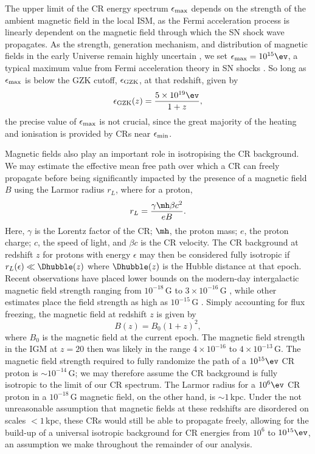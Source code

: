 The upper limit of the CR energy spectrum $\epsilon_{\rm max}$ depends on the strength of the ambient magnetic field in the local ISM, as the Fermi acceleration process is linearly dependent on the magnetic field through which the SN shock wave propagates. As the strength, generation mechanism, and distribution of magnetic fields in the early Universe remain highly uncertain \citep{DurrerNeronov2013}, we set $\epsilon_{\rm max} = 10^{15}\ev$, a typical maximum value from Fermi acceleration theory in SN shocks \citep[e.g.,][]{BlandfordEichler1987}.  So long as $\epsilon_{\rm max}$ is below the GZK cutoff, $\epsilon_{\rm \small GZK}$, at that redshift, given by \citep{StacyBromm2007}
\begin{equation}
\epsilon_{\rm \small GZK}(z) = \frac{5\times10^{19}\ev}{1+z},
\end{equation}
the precise value of $\epsilon_{\rm max}$ is not crucial, since the great majority of the heating and ionisation is provided by CRs near $\epsilon_{\rm min}$.

Magnetic fields also play an important role in isotropising the CR background.  We may estimate the effective mean free path over which a CR can freely propagate before being significantly impacted by the presence of a magnetic field $B$ using the Larmor radius $r_L$, where for a proton, 
\begin{equation}
r_L = \frac{\gamma \mh \beta c^2}{eB}.
\end{equation}
Here, $\gamma$ is the Lorentz factor of the CR; $\mh$, the proton mass; $e$, the proton charge; $c$, the speed of light, and $\beta c$ is the CR velocity. The CR background at redshift $z$ for protons with energy $\epsilon$ may then be considered fully isotropic if $r_L(\epsilon) \ll \Dhubble(z)$ where $\Dhubble(z)$ is the Hubble distance at that epoch. Recent observations have placed lower bounds on the modern-day intergalactic magnetic field strength ranging from $10^{-18}\,$G \citep{Dermeretal2011} to $3\times10^{-16}\,$G \citep{NeronovVovk2010}, while other estimates place the field strength as high as $10^{-15}\,$G \citep{AndoKusenko2010}.  Simply accounting for flux freezing, the magnetic field at redshift $z$ is given by
\begin{equation}
B(z) = B_0 (1+z)^2,
\end{equation}
where $B_0$ is the magnetic field at the current epoch. The magnetic field strength in the IGM at $z=20$ then was likely in the range $4\times10^{-16}$ to $4\times10^{-13}\,$G.  The magnetic field strength required to fully randomize the path of a $10^{15}\ev$ CR proton is $\sim$$10^{-14}\,$G; we may therefore assume the CR background is fully isotropic to the limit of our CR spectrum.  The Larmor radius for a $10^6\ev$ CR proton in a $10^{-18}\,$G magnetic field, on the other hand, is $\sim$$1\,$kpc.  Under the not unreasonable assumption that magnetic fields at these redshifts are disordered on scales $<1\,$kpc, these CRs would still be able to propagate freely, allowing for the build-up of a universal isotropic background for CR energies from $10^6$ to $10^{15}\ev$, an assumption we make throughout the remainder of our analysis.

